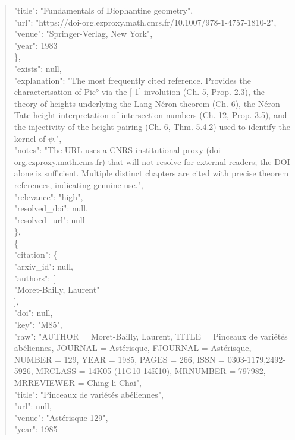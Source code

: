 \documentclass[11pt]{article}
\begin{document}
\begin{quote}
        "title": "Fundamentals of Diophantine geometry",\\
        "url": "https://doi-org.ezproxy.math.cnrs.fr/10.1007/978-1-4757-1810-2",\\
        "venue": "Springer-Verlag, New York",\\
        "year": 1983\\
      \},\\
      "exists": null,\\
      "explanation": "The most frequently cited reference. Provides the characterisation of Pic° via the [-1]-involution (Ch. 5, Prop. 2.3), the theory of heights underlying the Lang-Néron theorem (Ch. 6), the Néron-Tate height interpretation of intersection numbers (Ch. 12, Prop. 3.5), and the injectivity of the height pairing (Ch. 6, Thm. 5.4.2) used to identify the kernel of \ensuremath{\psi}.",\\
      "notes": "The URL uses a CNRS institutional proxy (doi-org.ezproxy.math.cnrs.fr) that will not resolve for external readers; the DOI alone is sufficient. Multiple distinct chapters are cited with precise theorem references, indicating genuine use.",\\
      "relevance": "high",\\
      "resolved\_doi": null,\\
      "resolved\_url": null\\
    \},\\
    \{\\
      "citation": \{\\
        "arxiv\_id": null,\\
        "authors": [\\
          "Moret-Bailly, Laurent"\\
        ],\\
        "doi": null,\\
        "key": "M85",\\
        "raw": "AUTHOR = Moret-Bailly, Laurent, TITLE = Pinceaux de variétés abéliennes, JOURNAL = Astérisque, FJOURNAL = Astérisque, NUMBER = 129, YEAR = 1985, PAGES = 266, ISSN = 0303-1179,2492-5926, MRCLASS = 14K05 (11G10 14K10), MRNUMBER = 797982, MRREVIEWER = Ching-li Chai",\\
        "title": "Pinceaux de variétés abéliennes",\\
        "url": null,\\
        "venue": "Astérisque 129",\\
        "year": 1985\\

\end{quote}
\end{document}
